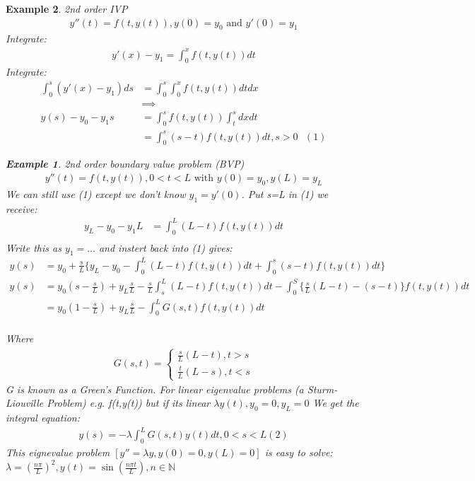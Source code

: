 \documentclass[10pt, oneside]{article}
\newcommand{\N}{\mathbb{N}}
\newtheorem{example}{Example}
\begin{document}
\begin{example}
2nd order IVP
\begin{align*}
    y''(t) = f(t,y(t)), y(0) = y_{0} \text{ and } y'(0) = y_{1} 
\end{align*}
Integrate:
\begin{align*}
    y'(x) - y_{1} = \int_{0}^{x}f(t,y(t))dt
\end{align*}
Integrate:
\begin{align*}
    \int_{0}^{s}(y'(x) - y_{1})ds &= \int_{0}^{s}\int_{0}^{x}f(t,y(t))dt dx \\
    & \implies \\
    y(s) - y_{0} - y_{1} s & = \int_{0}^{s}f(t,y(t))\int_{t}^{s}  dx dt\\
    & = \int_{0}^{s}(s-t)f(t,y(t))dt, s> 0\text{    } (1) 
\end{align*}
\begin{example}
    2nd order boundary value problem (BVP)
    \begin{align*}
        y''(t) =f(t,y(t)), 0<t<L \text{ with } y(0) = y_{0}, y(L) = y_{L}
    \end{align*}
    We can still use (1) except we don't know $y_{1} = y'(0)$. Put s=L in (1) we receive:
    \begin{align*}
        y_{L} - y_{0} - y_{1} L & = \int_{0}^{L}(L-t)f(t,y(t))dt \\
    \end{align*}
    Write this as $y_{1} = ...$ and instert back into (1) gives:
    \begin{align*}
        y(s) & = y_{0} + \frac{s}{L} \{ y_{L} - y_{0} - \int_{0}^{L}(L-t) f(t,y(t))dt + \int_{0}^{s}(s-t) f(t,y(t))dt\} \\
        y(s) & = y_{0}(s-\frac{s}{L})+ y_{L}\frac{s}{L}  - \frac{s}{L} \int_{s}^{L} (L-t)f(t,y(t))dt - \int_{0}^{S}\{\frac{s}{L}(L-t) - (s-t)\} f(t,y(t))dt \\
        & = y_{0} (1-\frac{s}{L}) + y_{L} \frac{s}{L} - \int_{0}^{L}G(s,t)f(t,y(t))dt \\
    \end{align*}
\end{example}
Where 
\begin{align*}
    G(s,t) = \begin{cases} \frac{s}{L}(L-t) , t > s \\
        \frac{t}{L}(L-s), t < s \end{cases}
\end{align*}
G is known as a Green's Function.
For linear eigenvalue problems (a Sturm-Liouville Problem) e.g. f(t,y(t)) but if its linear $\lambda y(t), y_{0} =0, y_{L} = 0$ We get the integral equation:
\begin{align*}
    y(s) = -\lambda \int_{0}^{L}G(s,t)y(t)dt, 0 < s < L (2)
\end{align*}
This eignevalue problem $[y''=\lambda y, y(0)=0, y(L) =0]$ is easy to solve:
$\lambda = (\frac{n \pi}{L})^{2}, y(t) = \sin(\frac{n \pi t}{L}), n \in \N$
\end{example}
\end{document}
